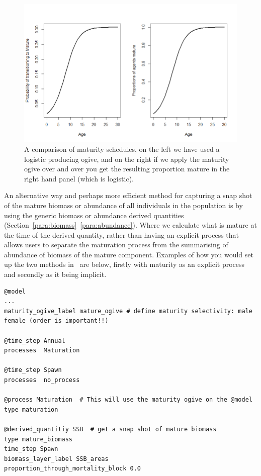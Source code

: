 \begin{figure}[htp]\label{fig:mature}
	\centering
	\includegraphics[scale=0.6]{Figures/maturity_ogives.png}%
	\caption{A comparison of maturity schedules, on the left we have used a logistic producing ogive, and on the right if we apply the maturity ogive over and over you get the resulting proportion mature in the right hand panel (which is logistic).}
\end{figure}


An alternative way and perhaps more efficient method for capturing a snap shot of the mature biomass or abundance of all individuals in the population is by using the generic biomass or abundance derived quantities (Section~\ref{para:biomass}~\ref{para:abundance}). Where we calculate what is mature at the time of the derived quantity, rather than having an explicit process that allows users to separate the maturation process from the summarising of abundance of biomass of the mature component. Examples of how you would set up the two methods in \IBM\ are below, firstly with maturity as an explicit process and secondly as it being implicit.

{\small{\begin{verbatim}
@model
...
maturity_ogive_label mature_ogive # define maturity selectivity: male female (order is important!!)

@time_step Annual
processes  Maturation 

@time_step Spawn
processes  no_process 

@process Maturation  # This will use the maturity ogive on the @model
type maturation

@derived_quantitiy SSB  # get a snap shot of mature biomass
type mature_biomass
time_step Spawn
biomass_layer_label SSB_areas
proportion_through_mortality_block 0.0
\end{verbatim}}}

